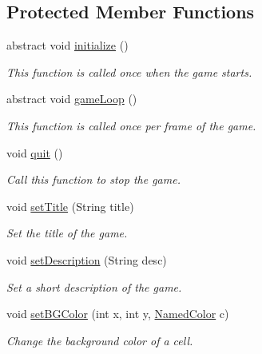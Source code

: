 \subsection*{Protected Member Functions}
\begin{DoxyCompactItemize}
\item 
abstract void \hyperlink{classbridges_1_1games_1_1_game_base_a973a52d5eee7c29b01d668fba3c61657}{initialize} ()
\begin{DoxyCompactList}\small\item\em This function is called once when the game starts. \end{DoxyCompactList}\item 
abstract void \hyperlink{classbridges_1_1games_1_1_game_base_a56d05ed744791cfc1c3792f39ff438f1}{game\+Loop} ()
\begin{DoxyCompactList}\small\item\em This function is called once per frame of the game. \end{DoxyCompactList}\item 
void \hyperlink{classbridges_1_1games_1_1_game_base_aa16a69dc83ee4e32150188e8acf1f897}{quit} ()
\begin{DoxyCompactList}\small\item\em Call this function to stop the game. \end{DoxyCompactList}\item 
void \hyperlink{classbridges_1_1games_1_1_game_base_a9f55e84af9bbf6497b314181c9d79f0a}{set\+Title} (String title)
\begin{DoxyCompactList}\small\item\em Set the title of the game. \end{DoxyCompactList}\item 
void \hyperlink{classbridges_1_1games_1_1_game_base_a3df3bee5b9d32cc9f164d06f9e9707dc}{set\+Description} (String desc)
\begin{DoxyCompactList}\small\item\em Set a short description of the game. \end{DoxyCompactList}\item 
void \hyperlink{classbridges_1_1games_1_1_game_base_ac9a231dd4425eb0f9dea2377653b23c4}{set\+B\+G\+Color} (int x, int y, \hyperlink{enumbridges_1_1base_1_1_named_color}{Named\+Color} c)
\begin{DoxyCompactList}\small\item\em Change the background color of a cell. \end{DoxyCompactList}\item 

\end{DoxyCompactItemize}
